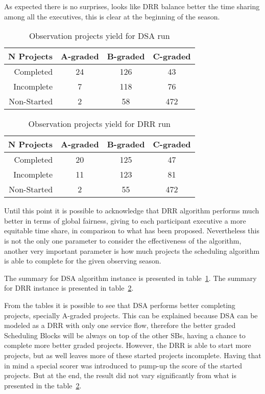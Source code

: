 As expected there is no surprises, looks like DRR balance better the time sharing among all the executives, this is clear at the beginning of the season. 

\begin{table}[b!]
\centering
\begin{tabular}{|r|c|c|c|} \hline
 N Projects & A-graded & B-graded & C-graded \\ \hline
 Completed & 24 & 126 & 43 \\ \hline
 Incomplete & 7 & 118 & 76 \\ \hline
 Non-Started & 2 & 58 & 472 \\ \hline
\end{tabular}
\caption{Observation projects yield for DSA run}
\label{table:dsa-run-summary}
\end{table}

\begin{table}[b!]
\centering
\begin{tabular}{|r|c|c|c|} \hline
 N Projects & A-graded & B-graded & C-graded \\ \hline
 Completed & 20 & 125 & 47 \\ \hline
 Incomplete & 11 & 123 & 81 \\ \hline
 Non-Started & 2 & 55 & 472 \\ \hline
\end{tabular}
\caption{Observation projects yield for DRR run}
\label{table:drr-run-summary}
\end{table}

Until this point it is possible to acknowledge that DRR algorithm performs much better in terms of global fairness, giving to each participant executive a more equitable time share, in comparison to what has been proposed. Nevertheless this is not the only one parameter to consider the effectiveness of the algorithm, another very important parameter is how much projects the scheduling algorithm is able to complete for the given observing season.

The summary for DSA algorithm instance is presented in table~\ref{table:dsa-run-summary}. The summary for DRR instance is presented in table~\ref{table:drr-run-summary}.

From the tables it is possible to see that DSA performs better completing projects, specially A-graded projects. This can be explained because DSA can be modeled as a DRR with only one service flow, therefore the better graded Scheduling Blocks will be always on top of the other SBs, having a chance to complete more better graded projects. However, the DRR is able to start more projects, but as well leaves more of these started projects incomplete. Having that in mind a special scorer was introduced to pump-up the score of the started projects. But at the end, the result did not vary significantly from what is presented in the table~\ref{table:drr-run-summary}.

